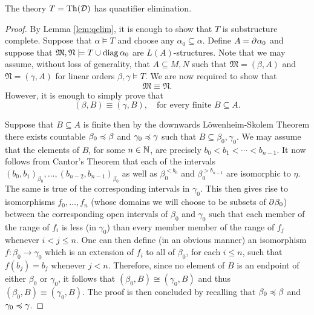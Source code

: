 \begin{thm} The theory $T=\operatorname{Th}(\mathcal{D})$ has quantifier elimination.
\end{thm}
\begin{proof} By Lemma \ref{lem:qelim}, it is enough to show that $T$ is
	substructure complete.  Suppose that $\alpha\models T$ and choose any
	$\alpha_0\subseteq\alpha$.  Define $A=\partial^{}{}\alpha_0$ and suppose that
	$\mathfrak{M},\mathfrak{N}\models T\cup\operatorname{diag}{\alpha_0}$ are $L(A)$-structures.
	Note that we may assume, without loss of generality, that $A\subseteq M,N$ such
	that $\mathfrak{M}=(\beta,A)$ and $\mathfrak{N}=(\gamma,A)$ for linear orders
	$\beta,\gamma\models T$.  We are now required to show that
	\begin{equation} \mathfrak{M}\equiv\mathfrak{N}.
	\end{equation} However, it is enough to simply prove that
	\begin{equation} (\beta,B)\equiv(\gamma,B),\quad\text{for every finite
		}B\subseteq A.
	\end{equation}

	Suppose that $B\subseteq A$ is finite then by the downwards
	L\"owenheim-Skolem Theorem there exists countable $\beta_0\preccurlyeq\beta$ and
	$\gamma_0\preccurlyeq\gamma$ such that $B\subseteq\beta_0,\gamma_0$.  We may assume
	that the elements of $B$, for some $n\in\mathbb{N}$, are precisely
	$b_0<b_1<\dotsb<b_{n-1}$.  It now follows from Cantor's Theorem that each of the
	intervals $(b_0,b_1)_{\beta_0},\dotsc,(b_{n-2},b_{n-1})_{\beta_0}$ as well as
	$\beta_0^{<b_0}$ and $\beta_0^{>b_{n-1}}$ are isomorphic to $\eta$.  The same is
	true of the corresponding intervals in $\gamma_0$.  This then gives rise to
	isomorphisms $f_0,\dotsc,f_n$ (whose domains we will choose to be subsets of
	$\partial^{}{}\beta_0$) between the corresponding open intervals of $\beta_0$ and
	$\gamma_0$ such that each member of the range of $f_i$ is less (in $\gamma_0$)
	than every member member of the range of $f_j$ whenever $i<j\leq n$.  One can
	then define (in an obvious manner) an isomorphism $f\colon\beta_0\to\gamma_0$
	which is an extension of $f_i$ to all of $\beta_0$, for each $i\leq n$, such
	that $f(b_j)=b_j$ whenever $j<n$.  Therefore, since no element of $B$ is an
	endpoint of either $\beta_0$ or $\gamma_0$, it follows that
	$(\beta_0,B)\cong(\gamma_0,B)$ and thus $(\beta_0,B)\equiv(\gamma_0,B)$.  The
	proof is then concluded by recalling that $\beta_0\preccurlyeq\beta$ and
	$\gamma_0\preccurlyeq\gamma$.
\end{proof}

